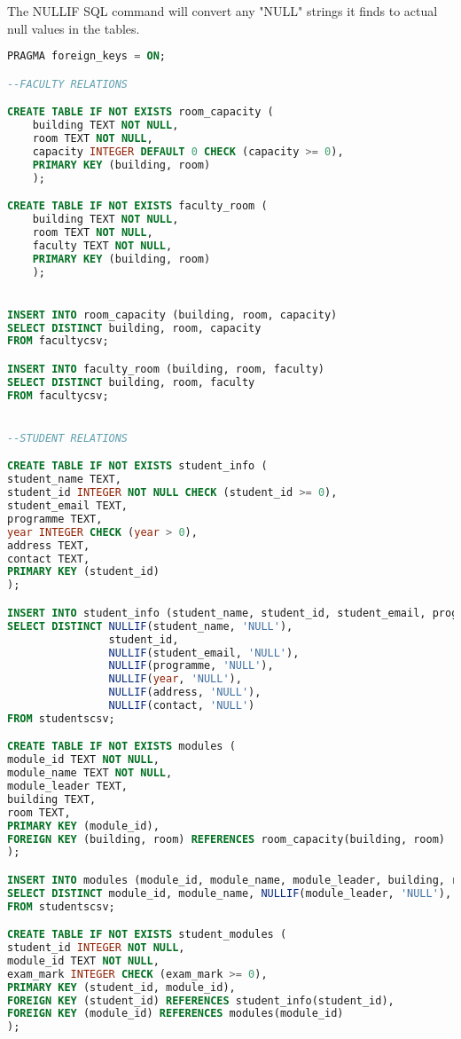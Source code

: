 \documentclass{article}
\begin{document}
The NULLIF SQL command will convert any "NULL" strings it finds to actual null values in the tables.

\begin{lstlisting}[language=SQL, caption=SQL Code to create and populate the tables in the database]
PRAGMA foreign_keys = ON;

--FACULTY RELATIONS

CREATE TABLE IF NOT EXISTS room_capacity (
    building TEXT NOT NULL,
    room TEXT NOT NULL,
    capacity INTEGER DEFAULT 0 CHECK (capacity >= 0),
    PRIMARY KEY (building, room)
    );

CREATE TABLE IF NOT EXISTS faculty_room (
    building TEXT NOT NULL,
    room TEXT NOT NULL,
    faculty TEXT NOT NULL,
    PRIMARY KEY (building, room)
    );


INSERT INTO room_capacity (building, room, capacity)
SELECT DISTINCT building, room, capacity
FROM facultycsv;

INSERT INTO faculty_room (building, room, faculty)
SELECT DISTINCT building, room, faculty
FROM facultycsv;


--STUDENT RELATIONS

CREATE TABLE IF NOT EXISTS student_info (
student_name TEXT, 
student_id INTEGER NOT NULL CHECK (student_id >= 0), 
student_email TEXT, 
programme TEXT, 
year INTEGER CHECK (year > 0), 
address TEXT, 
contact TEXT,
PRIMARY KEY (student_id)
);

INSERT INTO student_info (student_name, student_id, student_email, programme, year, address, contact)
SELECT DISTINCT NULLIF(student_name, 'NULL'), 
                student_id, 
                NULLIF(student_email, 'NULL'), 
                NULLIF(programme, 'NULL'), 
                NULLIF(year, 'NULL'),
                NULLIF(address, 'NULL'),
                NULLIF(contact, 'NULL')
FROM studentscsv;

CREATE TABLE IF NOT EXISTS modules (
module_id TEXT NOT NULL,
module_name TEXT NOT NULL,
module_leader TEXT,
building TEXT,
room TEXT,
PRIMARY KEY (module_id),
FOREIGN KEY (building, room) REFERENCES room_capacity(building, room)
);

INSERT INTO modules (module_id, module_name, module_leader, building, room)
SELECT DISTINCT module_id, module_name, NULLIF(module_leader, 'NULL'), NULLIF(building, 'NULL'), NULLIF(room, 'NULL')
FROM studentscsv;

CREATE TABLE IF NOT EXISTS student_modules (
student_id INTEGER NOT NULL,
module_id TEXT NOT NULL,
exam_mark INTEGER CHECK (exam_mark >= 0),
PRIMARY KEY (student_id, module_id),
FOREIGN KEY (student_id) REFERENCES student_info(student_id),
FOREIGN KEY (module_id) REFERENCES modules(module_id)
);


\end{lstlisting}
\end{document}
